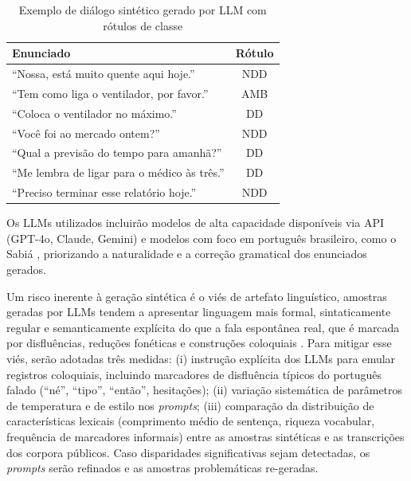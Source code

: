\documentclass[
    12pt,                %
    openright,           %
    oneside,             %
    a4paper,             %
    english,             %
    brazil               %
]{abntex2}
\begin{document}
\begin{table}[htb]
    \centering
    \caption{Exemplo de diálogo sintético gerado por LLM com rótulos de classe}
    \label{quad:dialogo_sintetico}
    \begin{tabular}{p{8cm}c}
        \toprule
        \textbf{Enunciado} & \textbf{Rótulo} \\
        \midrule
        ``Nossa, está muito quente aqui hoje.''
            & NDD \\
        ``Tem como liga o ventilador, por favor.''
            & AMB \\
        ``Coloca o ventilador no máximo.''
            & DD \\
        ``Você foi ao mercado ontem?''
            & NDD \\
        ``Qual a previsão do tempo para amanhã?''
            & DD \\
        ``Me lembra de ligar para o médico às três.''
            & DD \\
        ``Preciso terminar esse relatório hoje.''
            & NDD \\
        \bottomrule
    \end{tabular}
\end{table}

Os LLMs utilizados incluirão modelos de alta capacidade disponíveis via API (GPT-4o, Claude, Gemini) e modelos com foco em português brasileiro, como o Sabiá \cite{Pires2023}, priorizando a naturalidade e a correção gramatical dos enunciados gerados.

Um risco inerente à geração sintética é o viés de artefato linguístico, amostras geradas por LLMs tendem a apresentar linguagem mais formal, sintaticamente regular e semanticamente explícita do que a fala espontânea real, que é marcada por disfluências, reduções fonéticas e construções coloquiais \cite{Møller2024}. Para mitigar esse viés, serão adotadas três medidas: (i) instrução explícita dos LLMs para emular registros coloquiais, incluindo marcadores de disfluência típicos do português falado (``né'', ``tipo'', ``então'', hesitações); (ii) variação sistemática de parâmetros de temperatura e de estilo nos \textit{prompts}; (iii) comparação da distribuição de características lexicais (comprimento médio de sentença, riqueza vocabular, frequência de marcadores informais) entre as amostras sintéticas e as transcrições dos corpora públicos. Caso disparidades significativas sejam detectadas, os \textit{prompts} serão refinados e as amostras problemáticas re-geradas.
\end{document}
